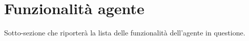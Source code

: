\section{Funzionalità agente}

Sotto-sezione che riporterà la lista delle funzionalità dell'agente in questione.
